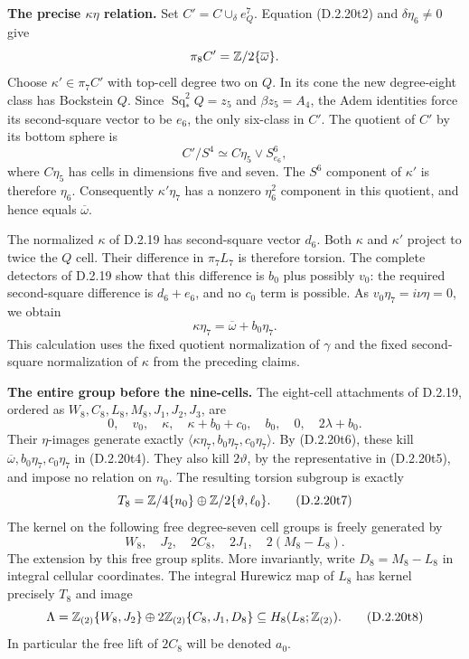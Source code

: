 \medskip\noindent
\textbf{The precise $\kappa\eta$ relation.}
Set $C'=C\cup_\delta e^7_Q$. Equation
\textup{(D.2.20t2)} and $\delta\eta_6\ne0$ give
\[
 \pi_8C'=\mathbb Z/2\{\overline\omega\}.
\]
Choose $\kappa'\in\pi_7C'$ with top-cell degree two on $Q$.
In its cone the new degree-eight class has Bockstein $Q$.
Since $\operatorname{Sq}_*^2Q=z_5$ and
$\beta z_5=A_4$, the Adem identities force its
second-square vector to be $e_6$, the only six-class in $C'$.
The quotient of $C'$ by its bottom sphere is
\[
 C'/S^4\simeq C\eta_{5}\vee S^6_{e_6},
\]
where $C\eta_5$ has cells in dimensions five and seven.
The $S^6$ component of $\kappa'$ is therefore $\eta_6$.
Consequently $\kappa'\eta_7$ has a nonzero $\eta_6^2$
component in this quotient, and hence equals
$\overline\omega$.

The normalized $\kappa$ of D.2.19 has second-square vector
$d_6$. Both $\kappa$ and $\kappa'$ project to twice the
$Q$ cell. Their difference in $\pi_7L_7$ is therefore
torsion. The complete detectors of D.2.19 show that this
difference is $b_0$ plus possibly $v_0$: the required
second-square difference is $d_6+e_6$, and no $c_0$ term
is possible. As $v_0\eta_7=i\nu\eta=0$, we obtain
\[
 \kappa\eta_7=\overline\omega+b_0\eta_7.
 \tag{D.2.20t6}
\]
This calculation uses the fixed quotient normalization of
$\gamma$ and the fixed second-square normalization of
$\kappa$ from the preceding claims.

\medskip\noindent
\textbf{The entire group before the nine-cells.}
The eight-cell attachments of D.2.19, ordered as
$W_8,C_8,L_8,M_8,J_1,J_2,J_3$, are
\[
 0,\quad v_0,\quad\kappa,\quad
 \kappa+b_0+c_0,\quad b_0,\quad0,\quad2\lambda+b_0.
\]
Their $\eta$-images generate exactly
$\langle\kappa\eta_7,b_0\eta_7,c_0\eta_7\rangle$.
By \textup{(D.2.20t6)}, these kill
$\overline\omega,b_0\eta_7,c_0\eta_7$ in
\textup{(D.2.20t4)}. They also kill $2\vartheta$, by
the representative in \textup{(D.2.20t5)}, and impose
no relation on $n_0$. The resulting torsion subgroup is exactly
\[
 T_8=\mathbb Z/4\{n_0\}\oplus
        \mathbb Z/2\{\vartheta,\ell_0\}.
 \tag{D.2.20t7}
\]
The kernel on the following free degree-seven cell groups
is freely generated by
\[
 W_8,\quad J_2,\quad2C_8,\quad2J_1,\quad2(M_8-L_8).
\]
The extension by this free group splits. More invariantly,
write $D_8=M_8-L_8$ in integral cellular coordinates.
The integral Hurewicz map of $L_8$ has kernel precisely
$T_8$ and image
\[
 \Lambda=\mathbb Z_{(2)}\{W_8,J_2\}
       \oplus2\mathbb Z_{(2)}\{C_8,J_1,D_8\}
 \subseteq H_8(L_8;\mathbb Z_{(2)}).
 \tag{D.2.20t8}
\]
In particular the free lift of $2C_8$ will be denoted $a_0$.

